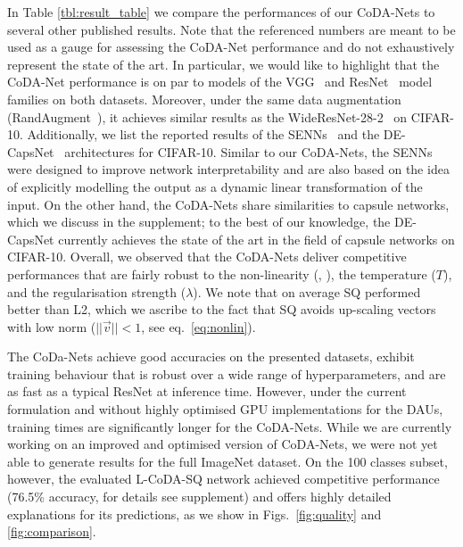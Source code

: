  In Table \ref{tbl:result_table} we compare the performances of our CoDA-Nets to several other published results. Note that the referenced numbers are meant to be used as a gauge for assessing the CoDA-Net performance and do not exhaustively represent the state of the art. In particular, we would like to highlight that the CoDA-Net performance is on par to models of the VGG~\cite{vgg} and ResNet~\cite{he2016deep} model families on both datasets. Moreover, under the same data augmentation (RandAugment~\cite{cubuk2019randaugment}), it achieves similar results as the WideResNet-28-2~\cite{zagoruyko2016wide} on CIFAR-10.
Additionally, we list the reported results of the SENNs~\cite{melis2018towards} and the DE-CapsNet~\cite{jia2020capsnet} architectures for CIFAR-10. Similar to our CoDA-Nets, the SENNs were designed to improve network interpretability and are also based on the idea of explicitly modelling the output as a dynamic linear transformation of the input. On the other hand, the CoDA-Nets share similarities to capsule networks, which we discuss in the supplement; to the best of our knowledge, the \mbox{DE-CapsNet} currently achieves the state of the art in the field of capsule networks on CIFAR-10. 
Overall, we observed that the CoDA-Nets deliver competitive performances that are fairly robust to the non-linearity (, ), the temperature ($T$), and the regularisation strength ($\lambda$). We note that on average SQ performed better than L2, which we ascribe to the fact that SQ avoids up-scaling vectors with low norm ($||\vec v||<1$, see eq.~\eqref{eq:nonlin}).

The CoDa-Nets achieve good accuracies on the presented datasets, exhibit training behaviour that is robust over a wide range of hyperparameters, and are as fast as a typical ResNet at inference time.
However, under the current formulation and without highly optimised GPU implementations for the DAUs, training times are significantly longer for the CoDA-Nets.
While we are currently working on an improved and optimised version of CoDA-Nets, we were not yet able to generate results for the full ImageNet dataset.
On the 100 classes subset, however, the evaluated L-CoDA-SQ network achieved competitive performance (76.5\% accuracy, for details see supplement) and offers highly detailed explanations for its predictions, as we show in Figs.~\ref{fig:quality} and \ref{fig:comparison}.
